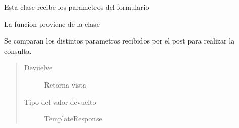 \documentclass[letterpaper,10pt,spanish]{sphinxmanual}
\begin{document}
\begin{fulllineitems}
\label{\detokenize{modules/libro/views:libro.views.LibrosVista}}
Esta clase recibe los parametros del formulario 

\begin{fulllineitems}
\label{\detokenize{modules/libro/views:libro.views.LibrosVista.post}}
La funcion proviene de la clase 

Se comparan los distintos parametros recibidos por el post para realizar la consulta.
\begin{quote}\begin{description}
\item[{Devuelve}] \leavevmode
Retorna vista 

\item[{Tipo del valor devuelto}] \leavevmode
TemplateResponse

\end{description}\end{quote}

\end{fulllineitems}


\end{fulllineitems}

\end{document}
